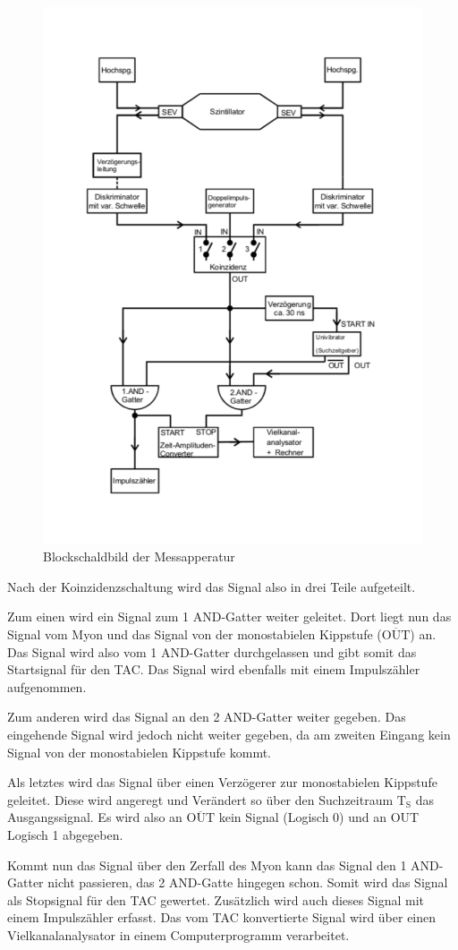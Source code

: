 \begin{figure}[h!]
  \centering
  \includegraphics[width=0.6 \textwidth]{schaltung.pdf}
  \caption{Blockschaldbild der Messapperatur \cite{1}}
  \label{fig:block}
\end{figure}
\FloatBarrier

Nach der Koinzidenzschaltung wird das Signal also in drei Teile aufgeteilt.

Zum einen wird ein Signal zum 1 AND-Gatter weiter geleitet.
Dort liegt nun das Signal vom Myon und das Signal von der monostabielen Kippstufe ($\overline{\text{OUT}}$) an.
Das Signal wird also vom 1 AND-Gatter durchgelassen und gibt somit das Startsignal für den TAC.
Das Signal wird ebenfalls mit einem Impulszähler aufgenommen.

Zum anderen wird das Signal an den 2 AND-Gatter weiter gegeben.
Das eingehende Signal wird jedoch nicht weiter gegeben, da am zweiten Eingang kein Signal von der monostabielen Kippstufe kommt.

Als letztes wird das Signal über einen Verzögerer zur monostabielen Kippstufe geleitet.
Diese wird angeregt und Verändert so über den Suchzeitraum $\text{T}_{\text{S}}$ das Ausgangssignal.
Es wird also an $\overline{\text{OUT}}$ kein Signal (Logisch 0) und an OUT Logisch 1 abgegeben.

Kommt nun das Signal über den Zerfall des Myon kann das Signal den 1 AND-Gatter nicht passieren, das 2 AND-Gatte hingegen schon.
Somit wird das Signal als Stopsignal für den TAC gewertet.
Zusätzlich wird auch dieses Signal mit einem Impulszähler erfasst.
Das vom TAC konvertierte Signal wird über einen Vielkanalanalysator in einem Computerprogramm verarbeitet.


